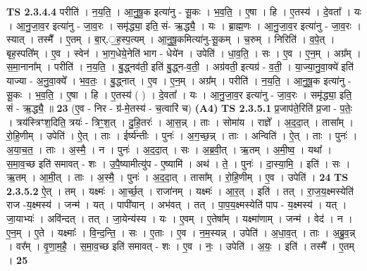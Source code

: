 \documentclass[17pt]{extarticle}
\begin{document}
                  \newline
                                \textbf{ TS 2.3.4.4} \newline
                  परीति॑ । न॒य॒ति॒ । आ॒नु॒षू॒क इत्या॑नु - सू॒कः । भ॒व॒ति॒ । ए॒षा । हि । ए॒तस्य॑ । दे॒वता᳚ । यः । आ॒नु॒जा॒व॒र इत्या॑नु - जा॒व॒रः । समृ॑द्ध्या॒ इति॒ सं- ऋ॒द्ध्यै॒ । यः । ब्रा॒ह्म॒णः । आ॒नु॒जा॒व॒र इत्या॑नु - जा॒व॒रः । स्यात् । तस्मै᳚ । ए॒तम् । बा॒र्.॒ह॒स्प॒त्यम् । आ॒नु॒षू॒कमित्या॑नु-सू॒कम् । च॒रुम् । निरिति॑ । व॒पे॒त् । बृह॒स्पति᳚म् । ए॒व । स्वेन॑ । भा॒ग॒धेये॒नेति॑ भाग - धेये॑न । उपेति॑ । धा॒व॒ति॒ । सः । ए॒व । ए॒न॒म् । अग्र᳚म् । स॒मा॒नाना᳚म् । परीति॑ । न॒य॒ति॒ । बु॒द्ध्नव॑ती॒ इति॑ बु॒द्ध्न-व॒ती॒ । अग्र॑वती॒ इत्यग्र॑ - व॒ती॒ । या॒ज्या॒नु॒वा॒क्ये॑ इति॑ याज्या - अ॒नु॒वा॒क्ये᳚ । भ॒व॒तः॒ । बु॒द्ध्नात् । ए॒व । ए॒न॒म् । अग्र᳚म् । परीति॑ । न॒य॒ति॒ । आ॒नु॒षू॒क इत्या॑नु - सू॒कः । भ॒व॒ति॒ । ए॒षा । हि । ए॒तस्य॑ ( ) । दे॒वता᳚ । यः । आ॒नु॒जा॒व॒र इत्या॑नु - जा॒व॒रः । समृ॑द्ध्या॒ इति॒ सं - ऋ॒द्ध्यै॒ ॥ \textbf{  23} \newline
                  \newline
                      (ए॒व - निर - ग्र॑-मे॒तस्य॑ - च॒त्वारि॑ च)  \textbf{(A4)} \newline \newline
                                \textbf{ TS 2.3.5.1} \newline
                  प्र॒जाप॑ते॒रिति॑ प्र॒जा - प॒तेः॒ । त्रय॑स्त्रिꣳश॒दिति॒ त्रयः॑ - त्रिꣳ॒॒श॒त् । दु॒हि॒तरः॑ । आ॒स॒न्न् । ताः । सोमा॑य । राज्ञे᳚ । अ॒द॒दा॒त् । तासा᳚म् । रो॒हि॒णीम् । उपेति॑ । ऐ॒त् । ताः । ईर्ष्य॑न्तीः । पुनः॑ । अ॒ग॒च्छ॒न्न् । ताः । अन्विति॑ । ऐ॒त् । ताः । पुनः॑ । अ॒या॒च॒त॒ । ताः । अ॒स्मै॒ । न । पुनः॑ । अ॒द॒दा॒त् । सः । अ॒ब्र॒वी॒त् । ऋ॒तम् । अ॒मी॒ष्व॒ । यथा᳚ । स॒मा॒व॒च्छ इति॑ समावत् - शः । उ॒पै॒ष्यामीत्यु॑प - ए॒ष्यामि॑ । अथ॑ । ते॒ । पुनः॑ । दा॒स्या॒मि॒ । इति॑ । सः । ऋ॒तम् । आ॒मी॒त् । ताः । अ॒स्मै॒ । पुनः॑ । अ॒द॒दा॒त् । तासा᳚म् । रो॒हि॒णीम् । ए॒व । उपेति॑ । \textbf{  24} \newline
                  \newline
                                \textbf{ TS 2.3.5.2} \newline
                  ऐ॒त् । तम् । यक्ष्मः॑ । आ॒र्च्छ॒त् । राजा॑नम् । यक्ष्मः॑ । आ॒र॒त् । इति॑ । तत् । रा॒ज॒य॒क्ष्मस्येति॑ राज -य॒क्ष्मस्य॑ । जन्म॑ । यत् । पापी॑यान् । अभ॑वत् । तत् । पा॒प॒य॒क्ष्मस्येति॑ पाप - य॒क्ष्मस्य॑ । यत् । जा॒याभ्यः॑ । अवि॑न्दत् । तत् । जा॒येन्य॑स्य । यः । ए॒वम् । ए॒तेषा᳚म् । यक्ष्मा॑णाम् । जन्म॑ । वेद॑ । न ।  ए॒न॒म् । ए॒ते । यक्ष्माः᳚ । वि॒न्द॒न्ति॒ । सः । ए॒ताः । ए॒व । न॒म॒स्यन्न् । उपेति॑ । अ॒धा॒व॒त् । ताः । अ॒ब्रु॒व॒न्न् । वर᳚म् । वृ॒णा॒म॒है॒ । स॒मा॒व॒च्छ इति॑ समावत् - शः । ए॒व । नः॒ । उपेति॑ । अ॒यः॒ । इति॑ । तस्मै᳚ । ए॒तम् । \textbf{  25} \newline
\end{document}
